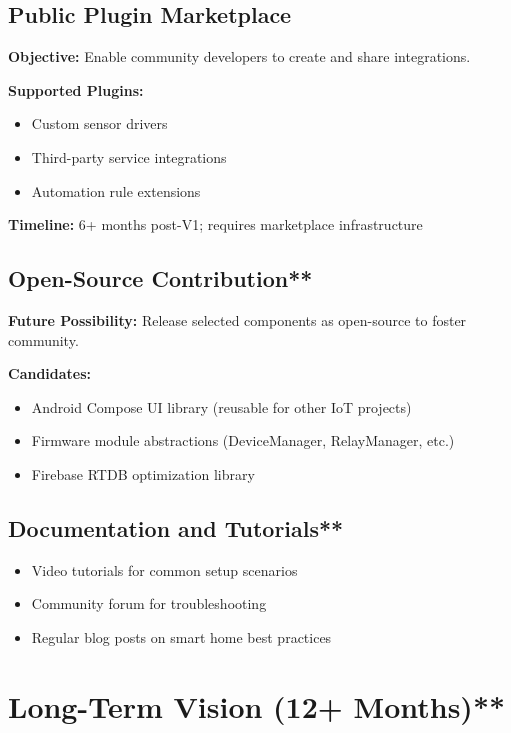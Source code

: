 \subsection{Public Plugin Marketplace}

\textbf{Objective:} Enable community developers to create and share integrations.

\textbf{Supported Plugins:}
\begin{itemize}
    \item Custom sensor drivers
    \item Third-party service integrations
    \item Automation rule extensions
\end{itemize}

\textbf{Timeline:} 6+ months post-V1; requires marketplace infrastructure

\subsection{Open-Source Contribution**}

\textbf{Future Possibility:} Release selected components as open-source to foster community.

\textbf{Candidates:}
\begin{itemize}
    \item Android Compose UI library (reusable for other IoT projects)
    \item Firmware module abstractions (DeviceManager, RelayManager, etc.)
    \item Firebase RTDB optimization library
\end{itemize}

\subsection{Documentation and Tutorials**}

\begin{itemize}
    \item Video tutorials for common setup scenarios
    \item Community forum for troubleshooting
    \item Regular blog posts on smart home best practices
\end{itemize}

\section{Long-Term Vision (12+ Months)**}

